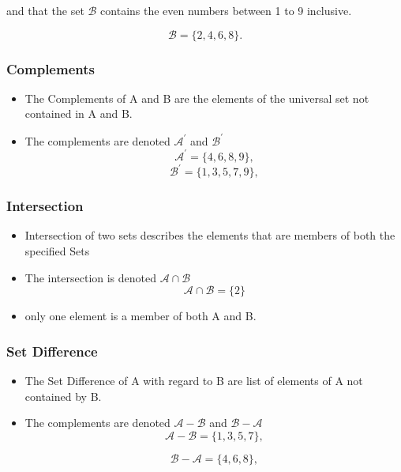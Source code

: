 \documentclass{article}
\begin{document}
and that the set $\mathcal{B}$ contains the even numbers between 1 to 9 inclusive.

\[ \mathcal{B} = \{2,4,6,8\}. \]

\subsubsection*{Complements}
\begin{itemize}

\item The Complements of A and B are the elements of the universal set not contained in A and B.

\item The complements are denoted $\mathcal{A}^{\prime}$ and $\mathcal{B}^{\prime}$
\[ \mathcal{A}^{\prime} = \{4,6,8,9\}, \]
\[ \mathcal{B}^{\prime} = \{1,3,5,7,9\}, \]

\end{itemize}



\subsubsection*{Intersection}
\begin{itemize}

\item Intersection of two sets describes the elements that are members of both the specified Sets

\item The intersection is denoted $\mathcal{A\cap B}$ 
\[ \mathcal{A\cap B} = \{2\}\]

\item only one element is a member of both A and B.
\end{itemize}

\subsubsection*{Set Difference}
\begin{itemize}

\item The Set Difference of A with regard to B are list of elements of A not contained by B.

\item The complements are denoted $\mathcal{A-B}$ and $\mathcal{B-A}$
\[ \mathcal{A-B} = \{1,3,5,7\}, \]

\[ \mathcal{B-A} = \{4,6,8\}, \]
\end{itemize}
\end{document}
